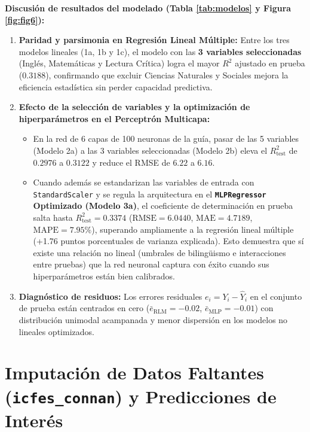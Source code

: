 \documentclass[11pt,letterpaper]{article}
\begin{document}
\textbf{Discusión de resultados del modelado (Tabla \ref{tab:modelos} y Figura \ref{fig:fig6}):}
\begin{enumerate}
    \item \textbf{Paridad y parsimonia en Regresión Lineal Múltiple:} Entre los tres modelos lineales (1a, 1b y 1c), el modelo con las \textbf{3 variables seleccionadas} (Inglés, Matemáticas y Lectura Crítica) logra el mayor $R^2$ ajustado en prueba ($0.3188$), confirmando que excluir Ciencias Naturales y Sociales mejora la eficiencia estadística sin perder capacidad predictiva.
    \item \textbf{Efecto de la selección de variables y la optimización de hiperparámetros en el Perceptrón Multicapa:}
    \begin{itemize}
        \item En la red de 6 capas de 100 neuronas de la guía, pasar de las 5 variables (Modelo 2a) a las 3 variables seleccionadas (Modelo 2b) eleva el $R^2_{\text{test}}$ de $0.2976$ a $0.3122$ y reduce el RMSE de $6.22$ a $6.16$.
        \item Cuando además se estandarizan las variables de entrada con \texttt{StandardScaler} y se regula la arquitectura en el \textbf{\texttt{MLPRegressor} Optimizado (Modelo 3a)}, el coeficiente de determinación en prueba salta hasta \textbf{$R^2_{\text{test}} = 0.3374$} ($\text{RMSE} = 6.0440$, $\text{MAE} = 4.7189$, $\text{MAPE} = 7.95\%$), superando ampliamente a la regresión lineal múltiple (+1.76 puntos porcentuales de varianza explicada). Esto demuestra que sí existe una relación no lineal (umbrales de bilingüismo e interacciones entre pruebas) que la red neuronal captura con éxito cuando sus hiperparámetros están bien calibrados.
    \end{itemize}
    \item \textbf{Diagnóstico de residuos:} Los errores residuales $e_i = Y_i - \hat{Y}_i$ en el conjunto de prueba están centrados en cero ($\bar{e}_{\text{RLM}} = -0.02$, $\bar{e}_{\text{MLP}} = -0.01$) con distribución unimodal acampanada y menor dispersión en los modelos no lineales optimizados.
\end{enumerate}

\section{Imputación de Datos Faltantes (\texttt{icfes\_connan}) y Predicciones de Interés}
\end{document}
